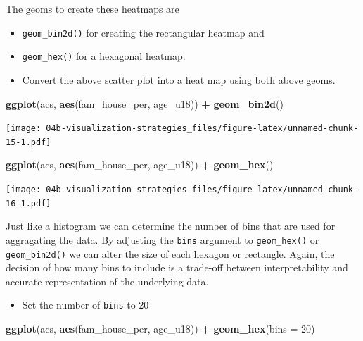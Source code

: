 \documentclass[
]{book}
\newenvironment{Shaded}{\begin{snugshade}}{\end{snugshade}}
\newcommand{\DataTypeTok}[1]{\textcolor[rgb]{0.13,0.29,0.53}{#1}}
\newcommand{\DecValTok}[1]{\textcolor[rgb]{0.00,0.00,0.81}{#1}}
\newcommand{\KeywordTok}[1]{\textcolor[rgb]{0.13,0.29,0.53}{\textbf{#1}}}
\newcommand{\NormalTok}[1]{#1}
\newcommand{\OperatorTok}[1]{\textcolor[rgb]{0.81,0.36,0.00}{\textbf{#1}}}
\newcommand{\StringTok}[1]{\textcolor[rgb]{0.31,0.60,0.02}{#1}}
\providecommand{\tightlist}{%
  \setlength{\itemsep}{0pt}\setlength{\parskip}{0pt}}
\begin{document}
The geoms to create these heatmaps are

\begin{itemize}
\item
  \texttt{geom\_bin2d()} for creating the rectangular heatmap and
\item
  \texttt{geom\_hex()} for a hexagonal heatmap.
\item
  Convert the above scatter plot into a heat map using both above geoms.
\end{itemize}

\begin{Shaded}
\begin{Highlighting}[]
\KeywordTok{ggplot}\NormalTok{(acs, }\KeywordTok{aes}\NormalTok{(fam\_house\_per, age\_u18)) }\OperatorTok{+}
\StringTok{  }\KeywordTok{geom\_bin2d}\NormalTok{()}
\end{Highlighting}
\end{Shaded}

\texttt{[image: 04b-visualization-strategies\_files/figure-latex/unnamed-chunk-15-1.pdf]}

\begin{Shaded}
\begin{Highlighting}[]
\KeywordTok{ggplot}\NormalTok{(acs, }\KeywordTok{aes}\NormalTok{(fam\_house\_per, age\_u18)) }\OperatorTok{+}
\StringTok{  }\KeywordTok{geom\_hex}\NormalTok{()}
\end{Highlighting}
\end{Shaded}

\texttt{[image: 04b-visualization-strategies\_files/figure-latex/unnamed-chunk-16-1.pdf]}

Just like a histogram we can determine the number of bins that are used for aggragating the data. By adjusting the \texttt{bins} argument to \texttt{geom\_hex()} or \texttt{geom\_bin2d()} we can alter the size of each hexagon or rectangle. Again, the decision of how many bins to include is a trade-off between interpretability and accurate representation of the underlying data.

\begin{itemize}
\tightlist
\item
  Set the number of \texttt{bins} to 20
\end{itemize}

\begin{Shaded}
\begin{Highlighting}[]
\KeywordTok{ggplot}\NormalTok{(acs, }\KeywordTok{aes}\NormalTok{(fam\_house\_per, age\_u18)) }\OperatorTok{+}
\StringTok{  }\KeywordTok{geom\_hex}\NormalTok{(}\DataTypeTok{bins =} \DecValTok{20}\NormalTok{)}
\end{Highlighting}
\end{Shaded}
\end{document}

